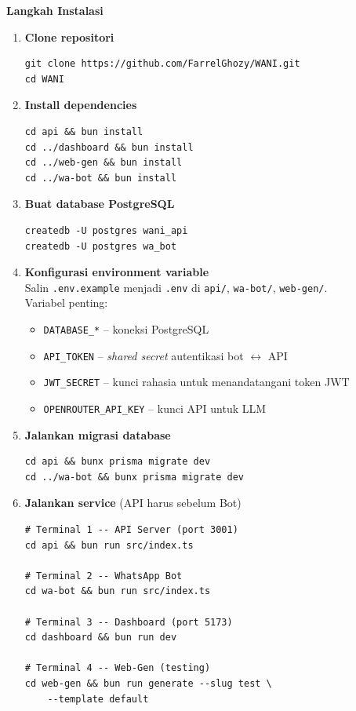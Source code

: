 \documentclass[12pt,a4paper,oneside]{article}
\begin{document}
\textbf{Langkah Instalasi}

\begin{enumerate}
	\item \textbf{Clone repositori}
	      \begin{lstlisting}[style=bash]
git clone https://github.com/FarrelGhozy/WANI.git
cd WANI
\end{lstlisting}

	\item \textbf{Install dependencies}
	      \begin{lstlisting}[style=bash]
cd api && bun install
cd ../dashboard && bun install
cd ../web-gen && bun install
cd ../wa-bot && bun install
\end{lstlisting}

	\item \textbf{Buat database PostgreSQL}
	      \begin{lstlisting}[style=bash]
createdb -U postgres wani_api
createdb -U postgres wa_bot
\end{lstlisting}

	\item \textbf{Konfigurasi environment variable} \\
	      Salin \texttt{.env.example} menjadi \texttt{.env} di \texttt{api/}, \texttt{wa-bot/}, \texttt{web-gen/}. \\
	      Variabel penting:
	      \begin{itemize}
		      \item \texttt{DATABASE\_*} -- koneksi PostgreSQL
		      \item \texttt{API\_TOKEN} -- \textit{shared secret} autentikasi bot $\leftrightarrow$ API
		      \item \texttt{JWT\_SECRET} -- kunci rahasia untuk menandatangani token JWT
		      \item \texttt{OPENROUTER\_API\_KEY} -- kunci API untuk LLM
	      \end{itemize}

	\item \textbf{Jalankan migrasi database}
	      \begin{lstlisting}[style=bash]
cd api && bunx prisma migrate dev
cd ../wa-bot && bunx prisma migrate dev
\end{lstlisting}

	\item \textbf{Jalankan service} (API harus sebelum Bot)
	      \begin{lstlisting}[style=bash]
# Terminal 1 -- API Server (port 3001)
cd api && bun run src/index.ts

# Terminal 2 -- WhatsApp Bot
cd wa-bot && bun run src/index.ts

# Terminal 3 -- Dashboard (port 5173)
cd dashboard && bun run dev

# Terminal 4 -- Web-Gen (testing)
cd web-gen && bun run generate --slug test \
    --template default
\end{lstlisting}
\end{enumerate}
\end{document}
